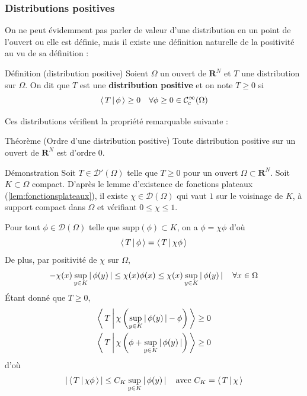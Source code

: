         \subsubsection{Distributions positives}

        On ne peut évidemment pas parler de valeur d’une distribution en un point de l’ouvert ou elle est définie, mais il existe une définition naturelle de la positivité au vu de sa définition :

        \begin{omed}{Définition (distribution positive)}
            Soient $\Omega$ un ouvert de $\mathbf{R}^N$ et $T$ une distribution sur $\Omega$. On dit que $T$ est une \textbf{distribution positive} et on note $T \geq 0$ si 
            \[ \left< \, T \, \middle| \, \phi \, \right> \geq 0 \quad \forall \phi \geq 0 \in \mathcal{C}_c^{\infty}(\Omega) \]
        \end{omed}

        Ces distributions vérifient la propriété remarquable suivante :

        \begin{omed}{Théorème (Ordre d’une distribution positive)}
            Toute distribution positive sur un ouvert de $\mathbf{R}^N$ est d’ordre 0.
        \end{omed}

        \begin{demo}{Démonstration}
            Soit $T \in \mathcal{D}'(\Omega)$ telle que $T \geq 0$ pour un ouvert $\Omega \subset \mathbf{R}^N$. Soit $K \subset \Omega$ compact. D’après le lemme d’existence de fonctions plateaux (\ref{lem:fonctionsplateaux}), il existe $\chi \in \mathcal{D}(\Omega)$ qui vaut $1$ sur le voisinage de $K$, à support compact dans $\Omega$ et vérifiant $0 \leq \chi \leq 1$.

            Pour tout $\phi \in \mathcal{D}(\Omega)$ telle que $\text{supp}(\phi) \subset K$, on a $\phi = \chi \phi$ d’où 
            \[ \left< \, T \, \middle| \, \phi \, \right> = \left< \, T \, \middle| \, \chi \phi \, \right> \]   
            De plus, par positivité de $\chi$ sur $\Omega$, 
            \[ -\chi(x) \sup_{y \in K}\left\lvert \, \phi(y) \, \right\rvert \leq \chi(x) \phi(x) \leq \chi(x) \sup_{y \in K}\left\lvert \, \phi(y) \, \right\rvert \quad \forall x \in \Omega \]   
            Étant donné que $T \geq 0$, 
            \begin{align*}
                \left< \, T \, \middle| \, \chi \left(\sup_{y \in K}\left\lvert \, \phi(y) \, \right\rvert - \phi\right) \, \right> &\geq 0 \\
                \left< \, T \, \middle| \, \chi \left(\phi + \sup_{y \in K}\left\lvert \, \phi(y) \, \right\rvert\right) \, \right> &\geq 0
            \end{align*}
            d’où 
            \[ \left\lvert \, \left< \, T \, \middle| \, \chi \phi  \, \right> \, \right\rvert \leq C_K \sup_{y \in K}\left\lvert \, \phi(y) \, \right\rvert \quad \text{avec } C_K = \left< \, T \, \middle| \, \chi \, \right> \]   
        \end{demo}

